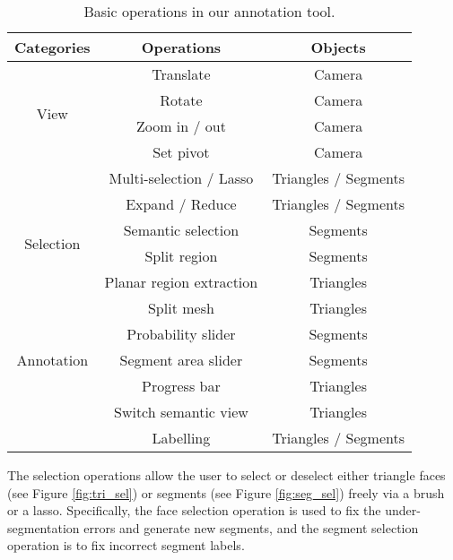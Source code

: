 \begin{table}[!tb]
	\centering
	\noindent{}
	{
		\begin{threeparttable}
			\centering
			\begin{tabular}{ccc}
				\toprule
				Categories & Operations & Objects \\
				\midrule
				\multirow{4}[2]{*}{View} & Translate & Camera \\
				& Rotate & Camera \\
				& Zoom in / out & Camera \\
				& Set pivot & Camera \\
				\midrule
				\multirow{6}[2]{*}{Selection} & Multi-selection / Lasso & Triangles / Segments \\
				& Expand / Reduce & Triangles / Segments \\
				& Semantic selection & Segments \\
				& Split region & Segments \\
				& Planar region extraction & Triangles \\
				& Split mesh & Triangles \\
				\midrule
				\multirow{3}[2]{*}{Annotation} & Probability slider & Segments \\
				& Segment area slider & Segments \\
				& Progress bar & Triangles \\
				& Switch semantic view & Triangles \\ 
				& Labelling & Triangles / Segments \\
				\bottomrule
			\end{tabular}%
		\end{threeparttable}
	}
	\caption{Basic operations in our annotation tool.} 
	\label{tab:annotation_operation}%
\end{table}%


The	selection operations allow the user to select or deselect either triangle faces (see Figure \ref{fig:tri_sel}) or segments (see Figure \ref{fig:seg_sel}) freely via a brush or a lasso.
Specifically, the face selection operation is used to fix the under-segmentation errors and generate new segments, and the segment selection operation is to fix incorrect segment labels.

